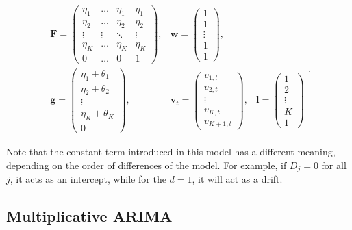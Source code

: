 \documentclass[
]{book}
\theoremstyle{definition}
\theoremstyle{definition}
\theoremstyle{definition}
\theoremstyle{definition}
\theoremstyle{remark}
\begin{document}
\begin{equation}
  \begin{aligned}
    \mathbf{F} = \begin{pmatrix} \eta_1 & \dots & \eta_1 & \eta_1 \\ \eta_2 & \dots & \eta_2 & \eta_2 \\ \vdots & \vdots & \ddots & \vdots \\ \eta_K & \dots & \eta_K & \eta_K \\ 0 & \dots & 0 & 1 \end{pmatrix}, & \mathbf{w} = \begin{pmatrix} 1 \\ 1 \\ \vdots \\ 1 \\ 1 \end{pmatrix}, \\
    \mathbf{g} = \begin{pmatrix} \eta_1 + \theta_1 \\ \eta_2 + \theta_2 \\ \vdots \\ \eta_K + \theta_K \\ 0 \end{pmatrix}, & \mathbf{v}_{t} = \begin{pmatrix} v_{1,t} \\ v_{2,t} \\ \vdots \\ v_{K,t} \\ v_{K+1,t} \end{pmatrix}, & \mathbf{l} = \begin{pmatrix} 1 \\ 2 \\ \vdots \\ K \\ 1 \end{pmatrix}
  \end{aligned}.
  \label{eq:ADAMARIMAMatricesConstant}
\end{equation}

Note that the constant term introduced in this model has a different meaning, depending on the order of differences of the model. For example, if \(D_j=0\) for all \(j\), it acts as an intercept, while for the \(d=1\), it will act as a drift.

\hypertarget{ADAMARIMAPureMultiplicative}{%
\subsection{Multiplicative ARIMA}\label{ADAMARIMAPureMultiplicative}}
\end{document}
